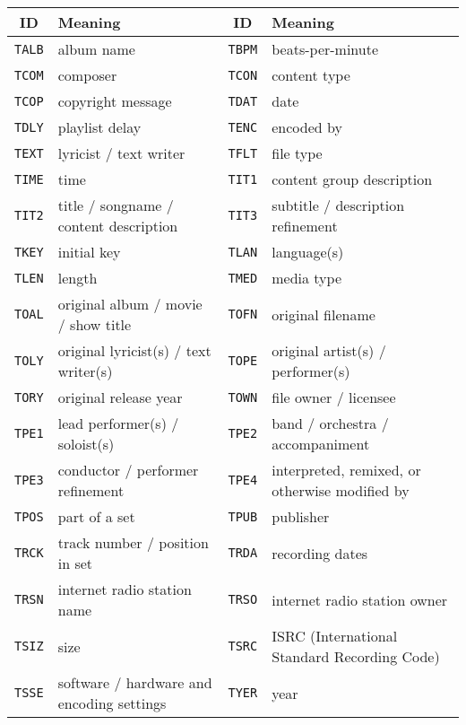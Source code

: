 \begin{table}[h]
{
\begin{tabular}{|c|l||c|l|}
\hline
ID & Meaning & ID & Meaning \\
\hline
\texttt{TALB} & album name &
\texttt{TBPM} & beats-per-minute \\
\texttt{TCOM} & composer &
\texttt{TCON} & content type \\
\texttt{TCOP} & copyright message &
\texttt{TDAT} & date \\
\texttt{TDLY} & playlist delay &
\texttt{TENC} & encoded by \\
\texttt{TEXT} & lyricist / text writer &
\texttt{TFLT} & file type \\
\texttt{TIME} & time &
\texttt{TIT1} & content group description \\
\texttt{TIT2} & title / songname / content description &
\texttt{TIT3} & subtitle / description refinement \\
\texttt{TKEY} & initial key &
\texttt{TLAN} & language(s) \\
\texttt{TLEN} & length &
\texttt{TMED} & media type \\
\texttt{TOAL} & original album / movie / show title &
\texttt{TOFN} & original filename \\
\texttt{TOLY} & original lyricist(s) / text writer(s) &
\texttt{TOPE} & original artist(s) / performer(s) \\
\texttt{TORY} & original release year &
\texttt{TOWN} & file owner / licensee \\
\texttt{TPE1} & lead performer(s) / soloist(s) &
\texttt{TPE2} & band / orchestra / accompaniment \\
\texttt{TPE3} & conductor / performer refinement &
\texttt{TPE4} & interpreted, remixed, or otherwise modified by \\
\texttt{TPOS} & part of a set &
\texttt{TPUB} & publisher \\
\texttt{TRCK} & track number / position in set &
\texttt{TRDA} & recording dates \\
\texttt{TRSN} & internet radio station name &
\texttt{TRSO} & internet radio station owner \\
\texttt{TSIZ} & size &
\texttt{TSRC} & ISRC (International Standard Recording Code) \\
\texttt{TSSE} & software / hardware and encoding settings &
\texttt{TYER} & year \\
\hline
\end{tabular}
}
\end{table}


